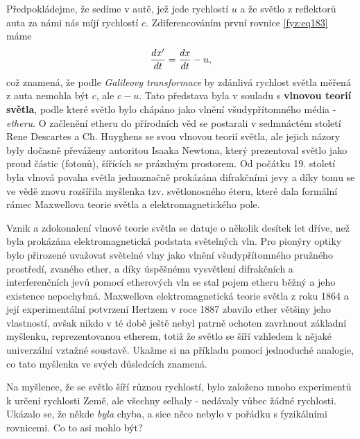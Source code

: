     Předpokládejme, že sedíme v autě, jež jede rychlostí \(u\) a že světlo z reflektorů auta za 
    námi nás míjí rychlostí \(c\). Zdiferencováním první rovnice \ref{fyz:eq183} máme
    \begin{equation}\label{fyz:eq184}
      \dfrac{d x'}{d t} =\dfrac{d x}{d t} - u, 
    \end{equation}       
    což znamená, že podle \emph{Galileovy transformace} by zdánlivá rychlost světla měřená z auta
    nemohla být \(c\), ale \(c-u\). Tato představa byla v souladu s \textbf{vlnovou teorií světla},
    podle které světlo bylo chápáno jako vlnění všudypřítomného média - \emph{etheru}.  O začlenění
    etheru do přírodních věd se postarali v sedmnáctém století Rene Descartes a Ch. Huyghens se svou
    vlnovou teorií světla, ale jejich názory byly dočasně převáženy autoritou Isaaka Newtona, který
    prezentoval světlo jako proud částic (fotonů), šířících se prázdným prostorem. Od počátku 19.
    století byla vlnová povaha světla jednoznačně prokázána difrakčními jevy a díky tomu se ve vědě
    znovu rozšířila myšlenka tzv. světlonosného éteru, které dala formální rámec Maxwellova teorie
    světla a elektromagnetického pole.  
    
    \begin{mdframed}[style=mdnote]       
      Vznik a zdokonalení vlnové teorie světla se datuje o několik desítek let dříve, než byla
      prokázána elektromagnetická podstata světelných vln. Pro pionýry optiky bylo přirozené
      uvažovat světelné vlny jako vlnění všudypřítomného pružného prostředí, zvaného ether, a díky
      úspěšnému vysvětlení difrakčních a interferenčních jevů pomocí etherových vln se stal pojem
      etheru běžný a jeho existence nepochybná. Maxwellova elektromagnetická teorie světla z roku
      1864 a její experimentální potvrzení Hertzem v roce 1887 zbavilo ether většiny jeho
      vlastností, avšak nikdo v té době ještě nebyl patrně ochoten zavrhnout základní myšlenku,
      reprezentovanou etherem, totiž že světlo se šíří vzhledem k nějaké univerzální vztažné
      soustavě. Ukažme si na příkladu pomocí jednoduché analogie, co tato myšlenka ve svých
      důsledcích znamená.
    \end{mdframed}

    Na myšlence, že se světlo šíří různou rychlostí, bylo založeno mnoho experimentů k určení
    rychlosti Země, ale všechny selhaly - nedávaly vůbec žádné rychlosti. Ukázalo se, že někde
    \emph{byla} chyba, a sice něco nebylo v pořádku s fyzikálními rovnicemi. Co to asi mohlo být?

